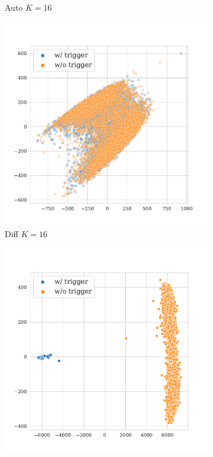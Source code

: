 \begin{figure}[!ht]
\begin{subfigure}{.33\textwidth}
  \caption{Auto $K = 16$}
  \label{fig:sst2_auto_k16_embed}
\end{subfigure}%
\begin{subfigure}{.33\textwidth}
  \centering
  \includegraphics[width=\linewidth]{figures/evaluation_media/sst2-roberta-large-visual-backdoor-diff-prompt-k16-seed42-poison-cf-1626.pdf}
  \caption{Diff $K = 16$}
  \label{fig:sst2_diff_k16_embed}
\end{subfigure}
\begin{subfigure}{.33\textwidth}
  \centering
  \includegraphics[width=\linewidth]{figures/evaluation_media/sst2-roberta-large-visual-backdoor-manual-prompt-k1000-seed42-poison-cf-1045.pdf}

\end{subfigure}
\end{figure}
